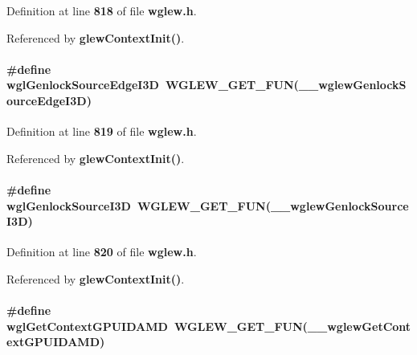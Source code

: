 Definition at line {\bf 818} of file {\bf wglew.\+h}.



Referenced by {\bf glew\+Context\+Init()}.

\paragraph[{wgl\+Genlock\+Source\+Edge\+I3D}]{\setlength{\rightskip}{0pt plus 5cm}\#define wgl\+Genlock\+Source\+Edge\+I3D~{\bf W\+G\+L\+E\+W\+\_\+\+G\+E\+T\+\_\+\+F\+UN}({\bf \+\_\+\+\_\+wglew\+Genlock\+Source\+Edge\+I3D})}\label{wglew_8h_a732c3b947c6e0e6a181605fddf7907d2}


Definition at line {\bf 819} of file {\bf wglew.\+h}.



Referenced by {\bf glew\+Context\+Init()}.

\paragraph[{wgl\+Genlock\+Source\+I3D}]{\setlength{\rightskip}{0pt plus 5cm}\#define wgl\+Genlock\+Source\+I3D~{\bf W\+G\+L\+E\+W\+\_\+\+G\+E\+T\+\_\+\+F\+UN}({\bf \+\_\+\+\_\+wglew\+Genlock\+Source\+I3D})}\label{wglew_8h_aa7a7a4ebdf71f9059bb5ee7e86faf43d}


Definition at line {\bf 820} of file {\bf wglew.\+h}.



Referenced by {\bf glew\+Context\+Init()}.

\paragraph[{wgl\+Get\+Context\+G\+P\+U\+I\+D\+A\+MD}]{\setlength{\rightskip}{0pt plus 5cm}\#define wgl\+Get\+Context\+G\+P\+U\+I\+D\+A\+MD~{\bf W\+G\+L\+E\+W\+\_\+\+G\+E\+T\+\_\+\+F\+UN}({\bf \+\_\+\+\_\+wglew\+Get\+Context\+G\+P\+U\+I\+D\+A\+MD})}\label{wglew_8h_a5db1a4ff6c82fc1ae12f16088dedf210}


